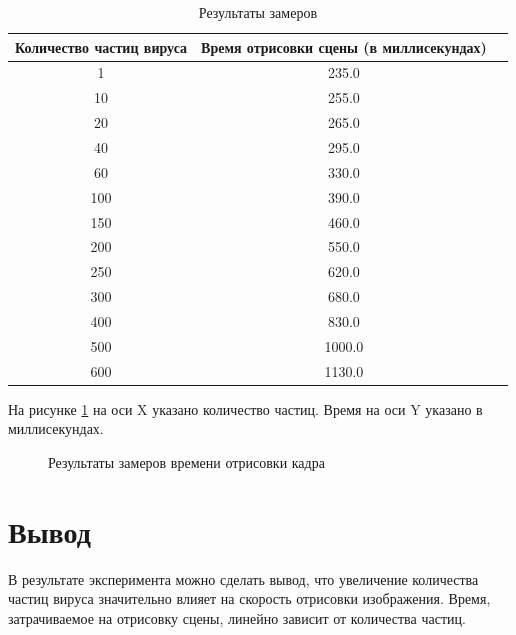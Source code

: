 \begin{table}[h]
	\begin{center}
		\begin{threeparttable}
			\captionsetup{justification=raggedright,singlelinecheck=off}
			\caption{\label{tbl:timings} Результаты замеров}
			\begin{tabular}{|c|c|c|}
				\hline
				Количество частиц вируса& Время отрисовки сцены (в миллисекундах) \\  \hline
				1 & 235.0 \\ \hline 
				10 & 255.0 \\ \hline 
				20 & 265.0 \\ \hline 
				40 & 295.0 \\ \hline 
				60 & 330.0 \\ \hline 
				100 & 390.0 \\ \hline 
				150 & 460.0 \\ \hline 
				200 & 550.0 \\ \hline 
				250 & 620.0 \\ \hline 
				300 & 680.0 \\ \hline 
				400 & 830.0 \\ \hline 
				500 & 1000.0 \\ \hline 
				600 & 1130.0 \\ \hline 
			\end{tabular}
		\end{threeparttable}
	\end{center}
\end{table}

На рисунке \ref{fig:timings} на оси X указано количество частиц. Время на оси Y указано в миллисекундах.

\begin{figure}[ph!]
	\caption{Результаты замеров времени отрисовки кадра}
	\label{fig:timings}
\end{figure}

\clearpage

\section*{Вывод}

В результате эксперимента можно сделать вывод, что увеличение количества частиц вируса значительно влияет на скорость отрисовки изображения. Время, затрачиваемое на отрисовку сцены, линейно зависит от количества частиц.


